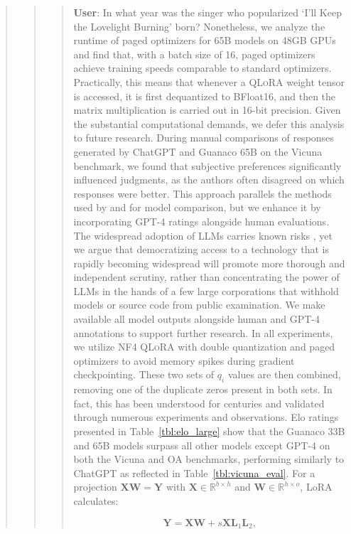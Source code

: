 \begin{quote}
\begin{abstract}
{{\begin{quote}
     \textbf{User}: In what year was the singer who popularized `I'll Keep the Lovelight Burning' born? Nonetheless, we analyze the runtime of paged optimizers for 65B models on 48GB GPUs and find that, with a batch size of 16, paged optimizers achieve training speeds comparable to standard optimizers. Practically, this means that whenever a \textsc{QLoRA} weight tensor is accessed, it is first dequantized to BFloat16, and then the matrix multiplication is carried out in 16-bit precision. Given the substantial computational demands, we defer this analysis to future research. During manual comparisons of responses generated by ChatGPT and {Guanaco} 65B on the Vicuna benchmark, we found that subjective preferences significantly influenced judgments, as the authors often disagreed on which responses were better. This approach parallels the methods used by \citet{bai2022training} and \citet{vicuna2023} for model comparison, but we enhance it by incorporating GPT-4 ratings alongside human evaluations. The widespread adoption of LLMs carries known risks \citep{bommasani2021opportunities,bender2021dangers}, yet we argue that democratizing access to a technology that is rapidly becoming widespread will promote more thorough and independent scrutiny, rather than concentrating the power of LLMs in the hands of a few large corporations that withhold models or source code from public examination. We make available all model outputs alongside human and GPT-4 annotations to support further research. In all experiments, we utilize NF4 \textsc{QLoRA} with double quantization and paged optimizers to avoid memory spikes during gradient checkpointing. These two sets of $q_i$ values are then combined, removing one of the duplicate zeros present in both sets. In fact, this has been understood for centuries and validated through numerous experiments and observations. Elo ratings presented in Table~\ref{tbl:elo_large} show that the {Guanaco} 33B and 65B models surpass all other models except GPT-4 on both the Vicuna and OA benchmarks, performing similarly to ChatGPT as reflected in Table~\ref{tbl:vicuna_eval}. For a projection ${\mathbf{X} \mathbf{W} = \mathbf{Y}}$ with $\mathbf{X}\in  \mathbb{R}^{b\times h}$ and $\mathbf{W}\in  \mathbb{R}^{h\times o}$, LoRA calculates:

\begin{equation}
    \mathbf{Y} = \mathbf{X}\mathbf{W} + s\mathbf{X}\mathbf{L}_1\mathbf{L}_2,
\end{equation}


\end{quote}}}
\end{abstract}
\end{quote}
